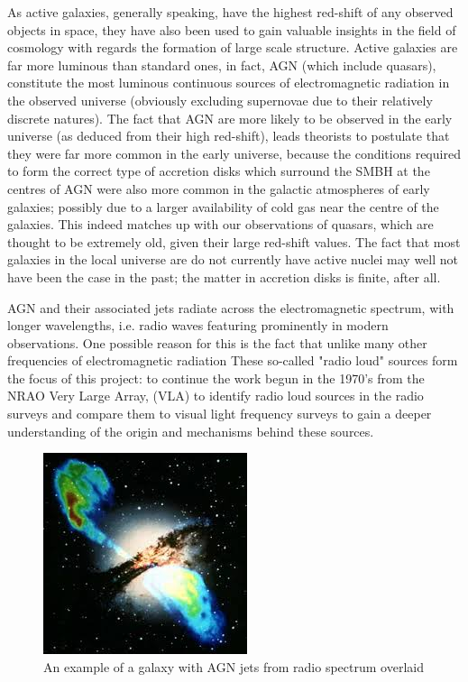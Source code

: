 \documentclass{article}
\begin{document}
As active galaxies, generally speaking, have the highest red-shift of any observed objects in space, they have also been used to gain valuable insights in the field of cosmology with regards the formation of large scale structure. Active galaxies are far more luminous than standard ones, in fact, AGN (which include quasars), constitute the most luminous continuous sources of electromagnetic radiation in the observed universe (obviously excluding supernovae due to their relatively discrete natures). The fact that AGN are more likely to be observed in the early universe (as deduced from their high red-shift), leads theorists to postulate that they were far more common in the early universe, because the conditions required to form the correct type of accretion disks which surround the SMBH at the centres of AGN were also more common in the galactic atmospheres of early galaxies; possibly due to a larger availability of cold gas near the centre of the galaxies. This indeed matches up with our observations of quasars, which are thought to be extremely old, given their large red-shift values. The fact that most galaxies in the local universe are do not currently have active nuclei may well not have been the case in the past; the matter in accretion disks is finite, after all. 

AGN and their associated jets radiate across the electromagnetic spectrum, with longer wavelengths, i.e. radio waves featuring prominently in modern observations. One possible reason for this is the fact that unlike many other frequencies of electromagnetic radiation These so-called "radio loud" sources form the focus of this project: to continue the work begun in the 1970's from the NRAO Very Large Array, (VLA) to identify radio loud sources in the radio surveys and compare them to visual light frequency surveys to gain a deeper understanding of the origin and mechanisms behind these sources.

\begin{figure}
\centering
\includegraphics[scale=1.5]{agn.jpeg}
\caption{An example of a galaxy with AGN jets from radio spectrum overlaid}
\label{fig:agn}
\end{figure}
\end{document}
